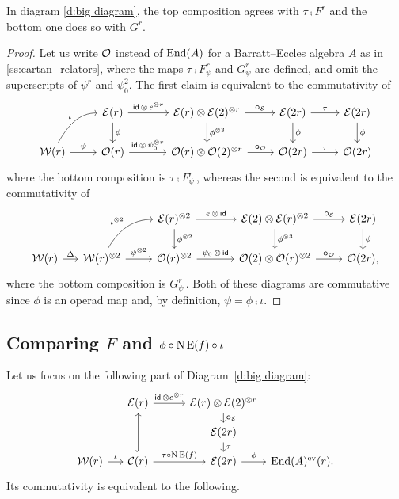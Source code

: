 \begin{lemma}\label{l:main_diag}
	In diagram \eqref{d:big diagram}, the top composition agrees with $\tau \comp F^r$ and the bottom one does so with $G^r$.
\end{lemma}

\begin{proof}
	Let us write $\mathcal{O}$ instead of $\mathrm{End}(A)$ for a Barratt--Eccles algebra $A$ as in \cref{ss:cartan_relators}, where the maps $\tau \comp F_\psi^r$ and $G_\psi^r$ are defined, and omit the superscripts of $\psi^r$ and $\psi_0^2$.
	The first claim is equivalent to the commutativity of
	\[
	\begin{tikzcd}
		&
		\BE(r) \arrow[d,"\phi"] \arrow[r,"\id\, \ot\, e^{\ot r}"] &[10pt]
		\BE(r) \ot \BE(2)^{\ot r} \arrow[d,"\phi^{\ot 3}"] \arrow[r,"\bcomp_{\BE}"] &
		\BE(2r) \arrow[d,"\phi"] \arrow[r,"\tau"] &
		\BE(2r) \arrow[d,"\phi"] \\
		\cW(r) \arrow[r,"\psi"] \arrow[ur, in=180, out=60,"\iota"] &
		\cO(r) \arrow[r,"\id\, \ot\, \psi_0^{\ot r}"] &
		\cO(r) \ot \cO(2)^{\ot r} \arrow[r,"\bcomp_{\cO}"] &
		\cO(2r) \arrow[r,"\tau"] &
		\cO(2r)
	\end{tikzcd}
	\]
	where the bottom composition is $\tau \comp F_\psi^r$\,, whereas the second is equivalent to the commutativity of
	\[
	\begin{tikzcd}
		&[-10pt] &
		\BE(r)^{\ot2} \arrow[d,"\phi^{\ot 2}"] \arrow[r,"e\,\ot\,\id"] &[10pt]
		\BE(2) \ot \BE(r)^{\ot2} \arrow[d,"\phi^{\ot 3}"] \arrow[r,"\bcomp_{\BE}"] &
		\BE(2r) \arrow[d,"\phi"] \\
		\cW(r) \arrow[r,"\Delta"] &
		\cW(r)^{\ot 2} \arrow[r,"\psi^{\ot 2}"] \arrow[ur, in=180, out=60,"\iota^{\ot 2}"] &
		\cO(r)^{\ot 2} \arrow[r,"\psi_0\,\ot\,\id"] &
		\cO(2) \ot \cO(r)^{\ot 2} \arrow[r,"\bcomp_{\cO}"] &
		\cO(2r),
	\end{tikzcd}
	\]
	where the bottom composition is $G_\psi^r$\,.
	Both of these diagrams are commutative since $\phi$ is an operad map and, by definition, $\psi = \phi \comp \iota$.
\end{proof}

\subsection{Comparing $F$ and $\phi \mathbin{\circ} \operatorname{N}\operatorname{E}(f) \mathbin{\circ} \iota$}

Let us focus on the following part of Diagram~\eqref{d:big diagram}:
\[
\begin{tikzcd}[row sep=small]
	&[-10pt]\BE(r) \arrow[r,"\id \, \ot e^{\ot r}"] &[5pt]
	\BE(r) \ot \BE(2)^{\ot r} \arrow[d,"\bcomp_{\BE}"] &[-20pt] \\ &
	&\BE(2r) \arrow[d, "\tau"] & \\
	\cW(r) \arrow[r,"\iota"] &
	\cC(r) \arrow[uu,hook] \arrow[r,"\tau \comp \chains\EE(f)"] &
	\BE(2r) \arrow[r,"\phi"] & \End(A)^\ev(r).
\end{tikzcd}
\]
Its commutativity is equivalent to the following.

